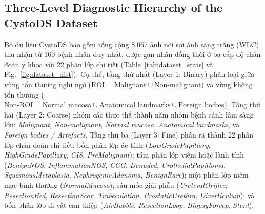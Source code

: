 \documentclass[runningheads]{llncs}
\begin{document}
\subsection{Three-Level Diagnostic Hierarchy of the CystoDS Dataset}
Bộ dữ liệu CystoDS \cite{ref_lee2026cystods} bao gồm tổng cộng 8.067 ảnh nội soi ánh sáng trắng (WLC) thu nhận từ 160 bệnh nhân duy nhất, được gán nhãn đồng thời ở ba cấp độ chẩn đoán y khoa với 22 phân lớp chi tiết (Table~\ref{tab:dataset_stats} và Fig.~\ref{fig:dataset_dist}). Cụ thể, tầng thứ nhất (Layer 1: Binary) phân loại giữa vùng tổn thương nghi ngờ ($\text{ROI} = \text{Malignant} \cup \text{Non-malignant}$) và vùng không tổn thương ($\text{Non-ROI} = \text{Normal mucosa} \cup \text{Anatomical landmarks} \cup \text{Foreign bodies}$). Tầng thứ hai (Layer 2: Coarse) nhóm các thực thể thành năm nhóm bệnh cảnh lâm sàng lớn: \textit{Malignant}, \textit{Non-malignant}, \textit{Normal mucosa}, \textit{Anatomical landmarks}, và \textit{Foreign bodies / Artefacts}. Tầng thứ ba (Layer 3: Fine) phân rã thành 22 phân lớp chẩn đoán chi tiết: bốn phân lớp ác tính (\textit{LowGradePapillary}, \textit{HighGradePapillary}, \textit{CIS}, \textit{PreMalignant}); tám phân lớp viêm hoặc lành tính (\textit{BenignNOS}, \textit{InflammationNOS}, \textit{CCG}, \textit{Denuded}, \textit{UrothelialPapilloma}, \textit{SquamousMetaplasia}, \textit{NephrogenicAdenoma}, \textit{BenignRare}); một phân lớp niêm mạc bình thường (\textit{NormalMucosa}); sáu mốc giải phẫu (\textit{UreteralOrifice}, \textit{ResectionBed}, \textit{ResectionScar}, \textit{Trabeculation}, \textit{ProstaticUrethra}, \textit{Diverticulum}); và bốn phân lớp dị vật can thiệp (\textit{AirBubble}, \textit{ResectionLoop}, \textit{BiopsyForcep}, \textit{Stent}).
\end{document}
